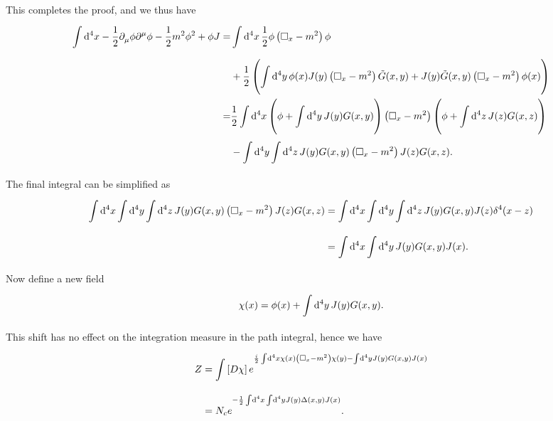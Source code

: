 This completes the proof, and we thus have
\begin{align*}
	\int\limits_{}^{}\dd[4]{x}-\frac{1}{2}\partial^{}_{\mu}\phi\partial^{\mu}_{}\phi - \frac{1}{2}m^{2}\phi^{2} + \phi J =& \int\limits_{}^{}\dd[4]{x}\frac{1}{2}\phi\left(\square_{x} - m^{2}\right)\phi \\
	&+ \frac{1}{2}\left(\int\limits_{}^{}\dd[4]{y}\phi(x)J(y)\left(\square_{x} - m^{2}\right)\tilde{G}(x, y) + J(y)\tilde{G}(x, y)\left(\square_{x} - m^{2}\right)\phi(x)\right) \\
	=& \frac{1}{2}\int\limits_{}^{}\dd[4]{x}\left(\phi + \int\limits_{}^{}\dd[4]{y}J(y)G(x, y)\right)\left(\square_{x} - m^{2}\right)\left(\phi + \int\limits_{}^{}\dd[4]{z}J(z)G(x, z)\right) \\
	 &- \int\limits_{}^{}\dd[4]{y}\int\limits_{}^{}\dd[4]{z}J(y)G(x, y)\left(\square_{x} - m^{2}\right)J(z)G(x, z).
\end{align*}
The final integral can be simplified as
\begin{align*}
	\int\limits_{}^{}\dd[4]{x}\int\limits_{}^{}\dd[4]{y}\int\limits_{}^{}\dd[4]{z}J(y)G(x, y)\left(\square_{x} - m^{2}\right)J(z)G(x, z) &= \int\limits_{}^{}\dd[4]{x}\int\limits_{}^{}\dd[4]{y}\int\limits_{}^{}\dd[4]{z}J(y)G(x, y)J(z)\delta^{4}(x - z) \\
	                           &= \int\limits_{}^{}\dd[4]{x}\int\limits_{}^{}\dd[4]{y}J(y)G(x, y)J(x).
\end{align*}
Now define a new field
\begin{align*}
	\chi(x) = \phi(x) + \int\limits_{}^{}\dd[4]{y}J(y)G(x, y).
\end{align*}
This shift has no effect on the integration measure in the path integral, hence we have
\begin{align*}
	Z &= \int\limits_{}\left[D\chi\right]e^{\frac{i}{2}\int\limits_{}^{}\dd[4]{x}\chi(x)\left(\square_{x} - m^{2}\right)\chi(y) - \int\limits_{}^{}\dd[4]{y}J(y)G(x, y)J(x)} \\
	  &= N_{c}e^{-\frac{1}{2}\int\limits_{}^{}\dd[4]{x}\int\limits_{}^{}\dd[4]{y}J(y)\Delta(x, y)J(x)}.
\end{align*}

